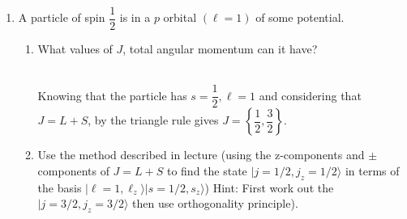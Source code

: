 \documentclass[fleqn]{article}
\begin{document}
  \begin{enumerate}
    \item A particle of spin $\dfrac{1}{2}$ is in a $p$ orbital $(\ell=1)$ of some potential.
    \begin{enumerate}
      \item What values of $J$, total angular momentum can it have?

        \textcolor{hwColor}{
          \\
          Knowing that the particle has $s=\dfrac{1}{2}, \ell=1$ and considering that $J=L+S$, by the 
          triangle rule gives $J=\left\{\dfrac{1}{2}, \dfrac{3}{2}\right\}$.
          \\
        }

      \item Use the method described in lecture (using the z-components and $\pm$ components of $J=L+S$
      to find the state $|j=1/2, j_z=1/2 \rangle$ in terms of the basis $|\ell=1, \ell_z \rangle|s=1/2, s_z \rangle$)
      Hint: First work out the $|j=3/2, j_z=3/2 \rangle$ then use orthogonality principle).


\end{enumerate}
\end{enumerate}
\end{document}
